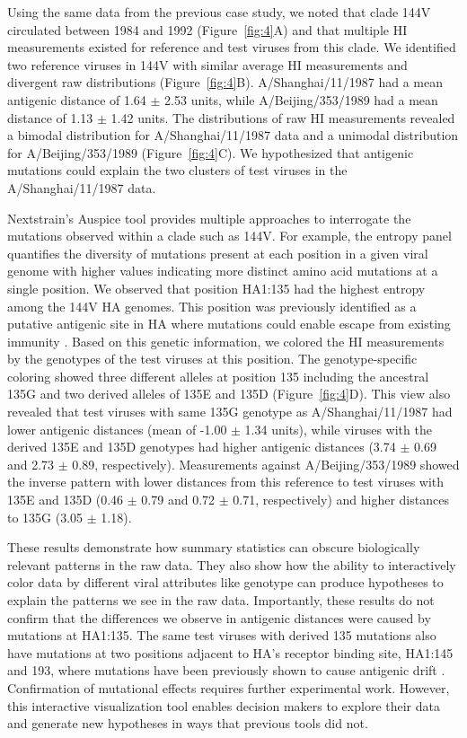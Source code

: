 \documentclass[utf8]{FrontiersinHarvard} %
\begin{document}
Using the same data from the previous case study, we noted that clade 144V circulated between 1984 and 1992 (Figure~\ref{fig:4}A) and that multiple HI measurements existed for reference and test viruses from this clade.
We identified two reference viruses in 144V with similar average HI measurements and divergent raw distributions (Figure~\ref{fig:4}B).
A/Shanghai/11/1987 had a mean antigenic distance of 1.64 $\pm$ 2.53 units, while A/Beijing/353/1989 had a mean distance of 1.13 $\pm$ 1.42 units.
The distributions of raw HI measurements revealed a bimodal distribution for A/Shanghai/11/1987 data and a unimodal distribution for A/Beijing/353/1989 (Figure~\ref{fig:4}C).
We hypothesized that antigenic mutations could explain the two clusters of test viruses in the A/Shanghai/11/1987 data.

Nextstrain's Auspice tool provides multiple approaches to interrogate the mutations observed within a clade such as 144V.
For example, the entropy panel quantifies the diversity of mutations present at each position in a given viral genome with higher values indicating more distinct amino acid mutations at a single position.
We observed that position HA1:135 had the highest entropy among the 144V HA genomes.
This position was previously identified as a putative antigenic site in HA where mutations could enable escape from existing immunity \citep{Wolf:2006da}.
Based on this genetic information, we colored the HI measurements by the genotypes of the test viruses at this position.
The genotype-specific coloring showed three different alleles at position 135 including the ancestral 135G and two derived alleles of 135E and 135D (Figure~\ref{fig:4}D).
This view also revealed that test viruses with same 135G genotype as A/Shanghai/11/1987 had lower antigenic distances (mean of -1.00 $\pm$ 1.34 units), while viruses with the derived 135E and 135D genotypes had higher antigenic distances (3.74 $\pm$ 0.69 and 2.73 $\pm$ 0.89, respectively).
Measurements against A/Beijing/353/1989 showed the inverse pattern with lower distances from this reference to test viruses with 135E and 135D (0.46 $\pm$ 0.79 and 0.72 $\pm$ 0.71, respectively) and higher distances to 135G (3.05 $\pm$ 1.18).

These results demonstrate how summary statistics can obscure biologically relevant patterns in the raw data.
They also show how the ability to interactively color data by different viral attributes like genotype can produce hypotheses to explain the patterns we see in the raw data.
Importantly, these results do not confirm that the differences we observe in antigenic distances were caused by mutations at HA1:135.
The same test viruses with derived 135 mutations also have mutations at two positions adjacent to HA's receptor binding site, HA1:145 and 193, where mutations have been previously shown to cause antigenic drift \citep{Koel:2013jz}.
Confirmation of mutational effects requires further experimental work.
However, this interactive visualization tool enables decision makers to explore their data and generate new hypotheses in ways that previous tools did not.
\end{document}
